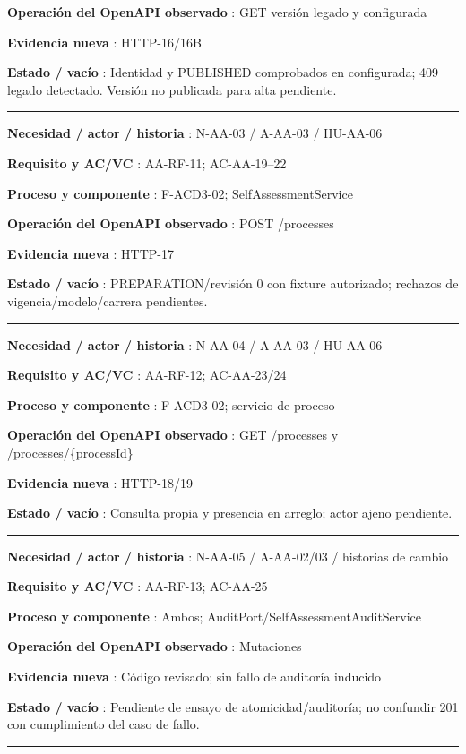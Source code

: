 \documentclass[11pt,a4paper]{article}
\begin{document}
\textbf{Operación del OpenAPI observado }: GET versión legado y
configurada

\textbf{Evidencia nueva }: HTTP-16/16B

\textbf{Estado / vacío }: Identidad y PUBLISHED comprobados en
configurada; 409 legado detectado. Versión no publicada para alta
pendiente.

\medskip\hrule\medskip

\textbf{Necesidad / actor / historia }: N-AA-03 / A-AA-03 / HU-AA-06

\textbf{Requisito y AC/VC }: AA-RF-11; AC-AA-19--22

\textbf{Proceso y componente }: F-ACD3-02; SelfAssessmentService

\textbf{Operación del OpenAPI observado }: POST /processes

\textbf{Evidencia nueva }: HTTP-17

\textbf{Estado / vacío }: PREPARATION/revisión 0 con fixture autorizado;
rechazos de vigencia/modelo/carrera pendientes.

\medskip\hrule\medskip

\textbf{Necesidad / actor / historia }: N-AA-04 / A-AA-03 / HU-AA-06

\textbf{Requisito y AC/VC }: AA-RF-12; AC-AA-23/24

\textbf{Proceso y componente }: F-ACD3-02; servicio de proceso

\textbf{Operación del OpenAPI observado }: GET /processes y
/processes/\{processId\}

\textbf{Evidencia nueva }: HTTP-18/19

\textbf{Estado / vacío }: Consulta propia y presencia en arreglo; actor
ajeno pendiente.

\medskip\hrule\medskip

\textbf{Necesidad / actor / historia }: N-AA-05 / A-AA-02/03 / historias
de cambio

\textbf{Requisito y AC/VC }: AA-RF-13; AC-AA-25

\textbf{Proceso y componente }: Ambos;
AuditPort/SelfAssessmentAuditService

\textbf{Operación del OpenAPI observado }: Mutaciones

\textbf{Evidencia nueva }: Código revisado; sin fallo de auditoría
inducido

\textbf{Estado / vacío }: Pendiente de ensayo de atomicidad/auditoría;
no confundir 201 con cumplimiento del caso de fallo.

\medskip\hrule\medskip
\end{document}
